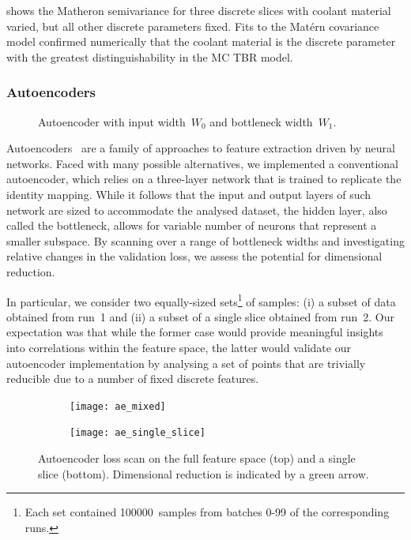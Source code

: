  shows the Matheron semivariance \cite{Matheron1963} for three discrete slices with coolant material varied, but all other discrete parameters fixed. Fits \cite{KrigingFig} to the Matérn covariance model confirmed numerically that the coolant material is the discrete parameter with the greatest distinguishability in the MC TBR model. 


\subsubsection{Autoencoders}

\begin{figure}
	\centering
	\vspace{-5ex}
	{\footnotesize {}}
	\caption{Autoencoder with input width~$W_0$ and bottleneck width~$W_1$.}
	\label{fig:autoencoder}
	\vspace{-9ex}
\end{figure}

Autoencoders~\cite{SCHMIDHUBER201585} are a family of approaches to feature extraction driven by neural
networks. Faced with many possible alternatives, we implemented a conventional
autoencoder, which relies on a three-layer network that is trained to replicate
the identity mapping. While it follows that the input and output layers of such
network are sized to accommodate the analysed dataset, the
hidden layer, also called the bottleneck, allows for variable number of
neurons that represent a smaller subspace. By scanning
over a range of bottleneck widths and investigating relative changes in the
validation loss, we assess the potential for dimensional reduction.

In particular, we consider two equally-sized sets\footnote{Each set contained
\num{100000}~samples from batches 0-99 of the corresponding runs.} of samples: (i) a subset of data obtained
from run~1 and (ii) a subset of a single slice obtained from run~2. Our
expectation was that while the former case would provide meaningful insights into
correlations within the feature space, the latter would validate our
autoencoder implementation by analysing a set of points that are trivially
reducible due to a number of fixed discrete features.

\begin{figure} %
	\centering
	\vspace{-1ex}
	\begin{subfigure}[b]{\linewidth}
		\texttt{[image: ae\_mixed]}
	\end{subfigure}

	\vspace{-0.2ex}

	\begin{subfigure}[b]{\linewidth}
		\texttt{[image: ae\_single\_slice]}
	\end{subfigure}

	\caption{Autoencoder loss scan on the full feature space (top) and a single slice
		(bottom). Dimensional reduction is indicated by a green arrow.}
	\label{fig:autoencoder-loss}
	\vspace{-6ex}
\end{figure}

